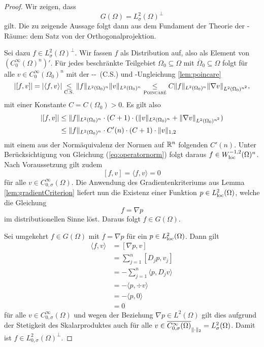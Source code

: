 \begin{proof}
  Wir zeigen, dass 
  \begin{equation}
    \label{eq:orthComplement}
    G(\Omega) = L_\sigma^2(\Omega)^\perp
  \end{equation}
  gilt.
  Die zu zeigende Aussage folgt dann aus dem Fundament der Theorie der \hilbert\hyp{}Räume: dem Satz von der Orthogonalprojektion.

  Sei dazu $f \in L_\sigma^2(\Omega)^\perp$.
  Wir fassen $f$ als Distribution auf, also als Element von $(C_0^\infty(\Omega)^n)'$.
  Für jedes beschränkte Teilgebiet $\Omega_0 \subseteq \Omega$ mit $\overline\Omega_0 \subseteq \Omega$ folgt für alle $v \in C_0^\infty(\Omega_0)^n$ mit der \cauchy\hyp\schwartz-\ (C.S.) und \poincare\hyp{}Ungleichung \ref{lem:poincare}
  $$
  |[f, v]| 
  = |\langle f, v \rangle| 
  \underset{\textsc{C.S.}}{\leq}  \norm{f}_{L^2(\Omega_0)^n} \norm{v}_{L^2(\Omega_0)^n}
  \underset{\poincare}{\leq} C \norm{f}_{L^2(\Omega_0)^n} \norm{\nabla v}_{L^2(\Omega_0)^{n^2}},
  $$
  mit einer Konstante $C = C(\Omega_0) > 0$.
  Es gilt also 
  \begin{align*}
    |[f, v]| 
    &\leq \norm{f}_{L^2(\Omega_0)^n} \cdot ( C + 1) \cdot (\norm{v}_{L^2(\Omega_0)^n} + \norm{\nabla v}_{L^2(\Omega_0)^{n^2}}) \\
    &\leq \norm{f}_{L^2(\Omega_0)^n} \cdot C'(n) \cdot ( C + 1) \cdot \norm{v}_{1,2}
  \end{align*}
  mit einem aus der Normäquivalenz der Normen auf $\R^n$ folgenden $C'(n)$.
  Unter Berücksichtigung von Gleichung (\ref{eq:operatornorm}) folgt daraus $f \in W_{\loc}^{-1,2}(\Omega)^n$.
  Nach Voraussetzung gilt zudem 
  $$
  [f,v] = \langle f, v \rangle = 0
  $$
  für alle $v \in C_{0, \sigma}^\infty(\Omega)$.
  Die Anwendung des Gradientenkriteriums aus Lemma \ref{lem:gradientCriterion} liefert nun die Existenz einer Funktion $p \in L_{\loc}^2(\Omega)$, welche die Gleichung
  $$
  f = \nabla p
  $$
  im distributionellen Sinne löst.
  Daraus folgt $f \in G(\Omega)$.

  Sei umgekehrt $f \in G(\Omega)$ mit $f = \nabla p$ für ein $p \in L^2_{\loc}(\Omega)$.
  Dann gilt
  \begin{align*}
  \langle f, v \rangle
  &= [ \nabla p, v ] \\
  &= \sum_{j = 1}^n [ D_j p , v_j ] \\
  &= - \sum_{j = 1}^n \langle p, D_j v \rangle \\
  &= - \langle p, \div v \rangle  \\
  &= - \langle p, 0 \rangle  \\
  &= 0
  \end{align*}
  für alle $v \in C_{0, \sigma}^\infty(\Omega)$ und wegen der Beziehung $\nabla p \in L^2(\Omega)$ gilt dies aufgrund der Stetigkeit des Skalarproduktes auch für alle $v \in \overline{C_{0, \sigma}^\infty(\Omega)}_{\norm{\cdot}_2} = L_\sigma^2(\Omega)$.
  Damit ist $f \in L_{0,\sigma}^2(\Omega)^\perp$.
\end{proof}

